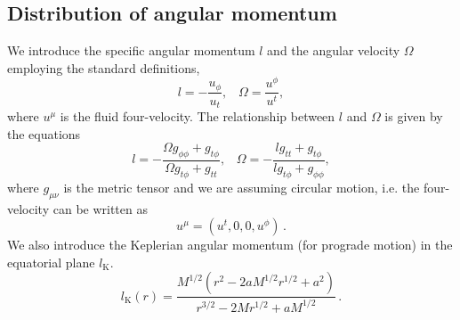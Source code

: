 \documentclass{aa}
\begin{document}
\subsection{Distribution of angular momentum}

We introduce the specific angular momentum $l$ and the angular velocity $\Omega$ employing the standard definitions,
\begin{equation}
l = - \frac{u_{\phi}}{u_t}, \;\;\; \Omega = \frac{u^{\phi}}{u^t},
\end{equation}
where $u^{\mu}$ is the fluid four-velocity.
The relationship between $l$ and $\Omega$ is given by the equations
\begin{equation}
l = - \frac{\Omega g_{\phi\phi} + g_{t\phi}}{\Omega g_{t\phi} + g_{tt}}, \;\;\; \Omega = - \frac{l g_{tt} + g_{t\phi}}{l g_{t\phi} + g_{\phi\phi}},
\end{equation}
where $g_{\mu\nu}$ is the metric tensor and we are assuming circular motion, i.e. the four-velocity can be written as
\begin{equation}
u^{\mu} = (u^t, 0, 0, u^{\phi})\,.
\end{equation}
We also introduce the Keplerian angular momentum (for prograde motion) in the equatorial plane $l_{\mathrm{K}}$. 
\begin{equation}\label{eq:kepler}
l_{\mathrm{K}}(r) = \frac{M^{1/2}(r^{2}-2aM^{1/2}r^{1/2}+a^{2})}{r^{3/2}-2Mr^{1/2}+aM^{1/2}}\,.
\end{equation}
\end{document}
